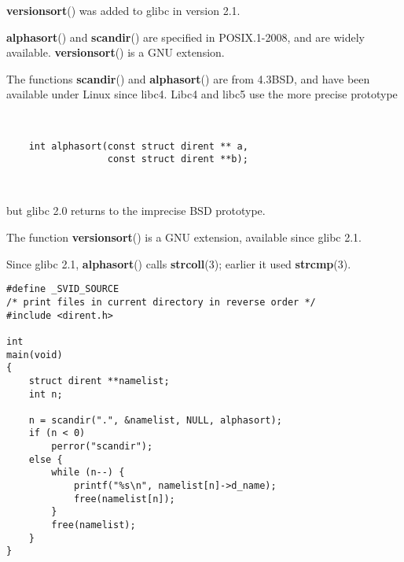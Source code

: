 \documentclass[]{article}
\let\realtextbf=\textbf
\renewcommand{\textbf}[1]{\textcolor{boldcolor}{\realtextbf{#1}}}
\begin{document}

\textbf{versionsort}() was added to glibc in version 2.1.


\textbf{alphasort}() and \textbf{scandir}() are specified in
POSIX.1-2008, and are widely available. \textbf{versionsort}() is a GNU
extension.

The functions \textbf{scandir}() and \textbf{alphasort}() are from
4.3BSD, and have been available under Linux since libc4. Libc4 and libc5
use the more precise prototype

~

\begin{verbatim}
    int alphasort(const struct dirent ** a,
                  const struct dirent **b);
\end{verbatim}

~

but glibc 2.0 returns to the imprecise BSD prototype.

The function \textbf{versionsort}() is a GNU extension, available since
glibc 2.1.

Since glibc 2.1, \textbf{alphasort}() calls \textbf{strcoll}(3); earlier
it used \textbf{strcmp}(3).


\begin{verbatim}
#define _SVID_SOURCE
/* print files in current directory in reverse order */
#include <dirent.h>

int
main(void)
{
    struct dirent **namelist;
    int n;

    n = scandir(".", &namelist, NULL, alphasort);
    if (n < 0)
        perror("scandir");
    else {
        while (n--) {
            printf("%s\n", namelist[n]->d_name);
            free(namelist[n]);
        }
        free(namelist);
    }
}
\end{verbatim}
\end{document}
